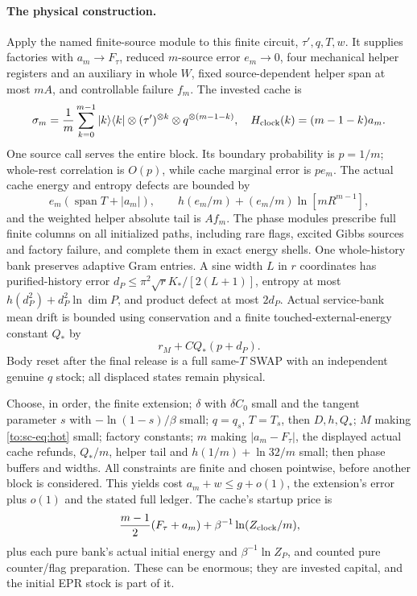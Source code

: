 \paragraph{The physical construction.}
Apply the named finite-source module to this finite circuit, $\tau',q,T,w$. It supplies factories with $a_m\to F_\tau$, reduced $m$-source error $e_m\to0$, four mechanical helper registers and an auxiliary in whole $W$, fixed source-dependent helper span at most $mA$, and controllable failure $f_m$. The invested cache is
\[
\sigma_m=\frac1m\sum_{k=0}^{m-1}|k\rangle\langle k|\otimes(\tau')^{\otimes k}\otimes q^{\otimes(m-1-k)},
\quad H_{\rm clock}(k)=(m-1-k)a_m.
\]
One source call serves the entire block. Its boundary probability is $p=1/m$; whole-rest correlation is $O(p)$, while cache marginal error is $p e_m$. The actual cache energy and entropy defects are bounded by
\[
e_m(\operatorname{span}T+|a_m|),\qquad
h(e_m/m)+(e_m/m)\ln[mR^{m-1}],
\]
and the weighted helper absolute tail is $Af_m$. The phase modules prescribe full finite columns on all initialized paths, including rare flags, excited Gibbs sources and factory failure, and complete them in exact energy shells. One whole-history bank preserves adaptive Gram entries. A sine width $L$ in $r$ coordinates has purified-history error $d_P\le\pi^2\sqrt r K_*/[2(L+1)]$, entropy at most $h(d_P^2)+d_P^2\ln\dim P$, and product defect at most $2d_P$. Actual service-bank mean drift is bounded using conservation and a finite touched-external-energy constant $Q_*$ by
\[
r_M+C Q_*(p+d_P).
\] Body reset after the final release is a full same-$T$ SWAP with an independent genuine $q$ stock; all displaced states remain physical.

Choose, in order, the finite extension; $\delta$ with $\delta C_0$ small and the tangent parameter $s$ with $-\ln(1-s)/\beta$ small; $q=q_s$, $T=T_s$, then $D,h,Q_*$; $M$ making \eqref{to:sc-eq:hot} small; factory constants; $m$ making $|a_m-F_\tau|$, the displayed actual cache refunds, $Q_*/m$, helper tail and $h(1/m)+\ln32/m$ small; then phase buffers and widths. All constraints are finite and chosen pointwise, before another block is considered. This yields cost $a_m+w\le g+o(1)$, the extension's error plus $o(1)$ and the stated full ledger. The cache's startup price is
\[
\frac{m-1}{2}(F_\tau+a_m)+\beta^{-1}\ln(Z_{\rm clock}/m),
\]
plus each pure bank's actual initial energy and $\beta^{-1}\ln Z_P$, and counted pure counter/flag preparation. These can be enormous; they are invested capital, and the initial EPR stock is part of it.

